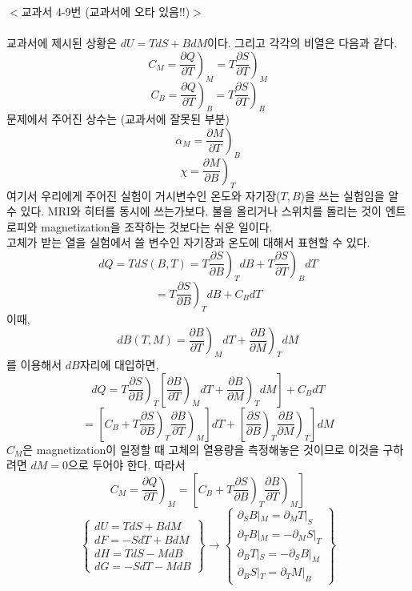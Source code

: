 \documentclass[a4paper,12pt]{article}
\begin{document}
	\begin{flushleft}
		$<$교과서 4-9번 (교과서에 오타 있음!!)$>$ 
	\end{flushleft}
\paragraph{}
교과서에 제시된 상황은 $dU=TdS+BdM$이다. 그리고 각각의 비열은 다음과 같다. 
$$C_M=\left. \frac{\partial Q}{\partial T}\right) _M=\left. T\frac{\partial S}{\partial T}\right) _M$$
$$C_B=\left. \frac{\partial Q}{\partial T}\right) _B=\left. T\frac{\partial S}{\partial T}\right) _B$$
문제에서 주어진 상수는 (교과서에 잘못된 부분)
$$\alpha_M=\left.\frac{\partial M}{\partial T} \right)_B $$
$$\chi=\left. \frac{\partial M}{\partial B}\right)_T $$
여기서 우리에게 주어진 실험이 거시변수인 온도와 자기장($T,B$)을 쓰는 실험임을 알 수 있다. MRI와 히터를 동시에 쓰는가보다. 불을 올리거나 스위치를 돌리는 것이 엔트로피와 magnetization을 조작하는 것보다는 쉬운 일이다. \\
고체가 받는 열을 실험에서 쓸 변수인 자기장과 온도에 대해서 표현할 수 있다. 
$$dQ=TdS(B,T)=T\left.\frac{\partial S}{\partial B} \right)_T dB +T\left.\frac{\partial S}{\partial T} \right)_B dT$$
$$=T\left.\frac{\partial S}{\partial B} \right)_T dB +C_B dT$$
이때,
$$dB(T,M)=\left. \frac{\partial B}{\partial T}\right)_M dT+\left. \frac{\partial B}{\partial M}\right)_T dM  $$
를 이용해서 $dB$자리에 대입하면, 
$$dQ=T\left.\frac{\partial S}{\partial B} \right)_T \left[\left. \frac{\partial B}{\partial T}\right)_M dT+\left. \frac{\partial B}{\partial M}\right)_T dM \right]  +C_B dT$$
$$=\left[C_B+T\left.\frac{\partial S}{\partial B} \right)_T \left.\frac{\partial B}{\partial T} \right)_M \right]dT +\left[ \left.\frac{\partial S}{\partial B} \right)_T \left.\frac{\partial B}{\partial M} \right)_T\right]dM $$
$C_M$은 magnetization이 일정할 때 고체의 열용량을 측정해놓은 것이므로 이것을 구하려면 $dM=0$으로 두어야 한다. 따라서
$$C_M=\left. \frac{\partial Q}{\partial T}\right) _M=\left[C_B+T\left.\frac{\partial S}{\partial B} \right)_T \left.\frac{\partial B}{\partial T} \right)_M \right]$$
$$ \begin{Bmatrix}
dU=TdS+BdM\\dF=-SdT+BdM\\dH=TdS-MdB\\dG=-SdT-MdB
\end{Bmatrix}\longrightarrow\begin{Bmatrix}
\partial_S B|_M=\partial_M T|_S\\\partial_T B|_M=-\partial_M S|_T\\\partial_B T|_S=-\partial_S B|_M\\\partial_B S|_T=\partial_T M|_B
\end{Bmatrix}$$
\end{document}
